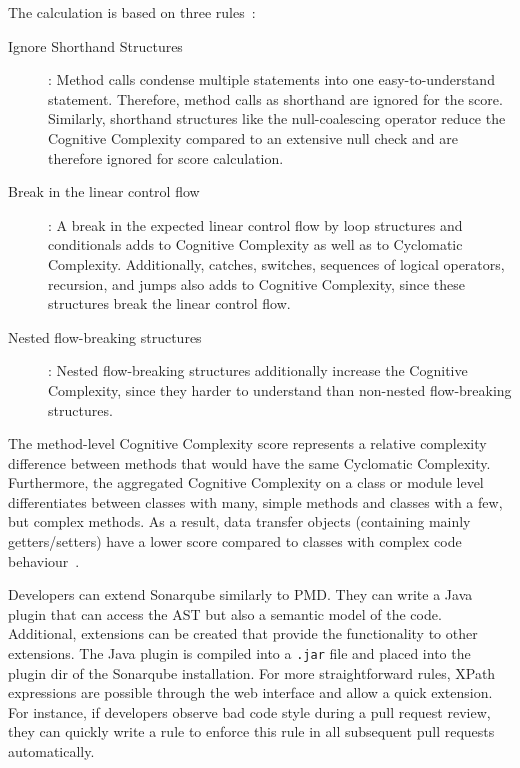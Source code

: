 The calculation is based on three rules~\cite{campbell2018cognitive}:
\begin{description}
    \item[Ignore Shorthand Structures]: Method calls condense multiple statements into one easy-to-understand statement. Therefore, method calls as shorthand are ignored for the score. Similarly, shorthand structures like the null-coalescing operator reduce the Cognitive Complexity compared to an extensive null check and are therefore ignored for score calculation.
    \item[Break in the linear control flow]: A break in the expected linear control flow by loop structures and conditionals adds to Cognitive Complexity as well as to Cyclomatic Complexity. Additionally, catches, switches, sequences of logical operators, recursion, and jumps also adds to Cognitive Complexity, since these structures break the linear control flow.
    \item[Nested flow-breaking structures]: Nested flow-breaking structures additionally increase the Cognitive Complexity, since they harder to understand than non-nested flow-breaking structures.  
\end{description}
The method-level Cognitive Complexity score represents a relative complexity difference between methods that would have the same Cyclomatic Complexity. Furthermore, the aggregated Cognitive Complexity on a class or module level differentiates between classes with many, simple methods and classes with a few, but complex methods. As a result, data transfer objects (containing mainly getters/setters) have a lower score compared to classes with complex code behaviour~\cite{campbell2018cognitive}.

Developers can extend Sonarqube similarly to PMD. They can write a Java plugin that can access the AST but also a semantic model of the code. Additional, extensions can be created that provide the functionality to other extensions. The Java plugin is compiled into a \texttt{.jar} file and placed into the plugin dir of the Sonarqube installation. For more straightforward rules, XPath expressions are possible through the web interface and allow a quick extension. For instance, if developers observe bad code style during a pull request review, they can quickly write a rule to enforce this rule in all subsequent pull requests automatically.

